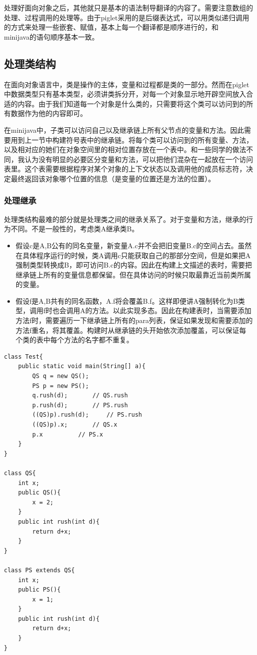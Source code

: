 \documentclass[10pt,a4paper]{article}
\begin{document}
处理好面向对象之后，其他就只是基本的语法制导翻译的内容了。需要注意数组的处理、过程调用的处理等。由于piglet采用的是后缀表达式，可以用类似递归调用的方式来处理一些嵌套、赋值，基本上每一个翻译都是顺序进行的，和\\minijava的语句顺序基本一致。

\subsection{处理类结构}

在面向对象语言中，类是操作的主体，变量和过程都是类的一部分。然而在piglet中数据类型只有基本类型，必须讲类拆分开，对每一个对象显示地开辟空间放入合适的内容。由于我们知道每一个对象是什么类的，只需要将这个类可以访问到的所有数据作为他的内容即可。

在minijava中，子类可以访问自己以及继承链上所有父节点的变量和方法。因此需要用到上一节中构建符号表中的继承链。将每个类可以访问到的所有变量、方法，以及相对应的她们在对象空间里的相对位置存放在一个表中。和一些同学的做法不同，我认为没有明显的必要区分变量和方法，可以把他们混杂在一起放在一个访问表里。这个表需要根据程序对某个对象的上下文状态以及调用他的成员标志符，决定最终返回该对象哪个位置的信息（是变量的位置还是方法的位置）。

\subsubsection{处理继承}

处理类结构最难的部分就是处理类之间的继承关系了。对于变量和方法，继承的行为不同。不是一般性的，考虑类A继承类B。
\begin{itemize}
	\item 假设c是A,B公有的同名变量，新变量A.c并不会把旧变量B.c的空间占去。虽然在具体程序运行的时候，类A调用c只能获取自己的那部分空间，但是如果把A强制类型转换成B，即可访问B.c的内容。因此在构建上文描述的表时，需要把继承链上所有的变量信息都保留。但在具体访问的时候只取最靠近当前类所属的变量。

	\item 假设f是A,B共有的同名函数，A.f将会覆盖B.f。这样即便讲A强制转化为B类型，调用f时也会调用A的方法。以此实现多态。因此在构建表时，当需要添加方法f时，需要遍历一下继承链上所有的para列表，保证如果发现和需要添加的方法f重名，将其覆盖。构建时从继承链的头开始依次添加覆盖，可以保证每个类的表中每个方法的名字都不重复。
\end{itemize}

\begin{lstlisting}
class Test{
	public static void main(String[] a){
		QS q = new QS();
		PS p = new PS();
		q.rush(d);		 // QS.rush
		p.rush(d);		 // PS.rush
		((QS)p).rush(d);	 // PS.rush
		((QS)p).x;		 // QS.x
		p.x			 // PS.x
	}
}

class QS{
	int x;
	public QS(){
		x = 2;
	}
	public int rush(int d){
		return d+x;
	}
}

class PS extends QS{
	int x;
	public PS(){
		x = 1;
	}
	public int rush(int d){
		return d+x;
	}
}
\end{lstlisting}
\end{document}
